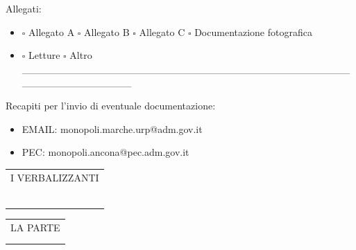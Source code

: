 \documentclass[12pt]{article}
\makeatletter
\newcommand\signature{%
  \par\vspace{8ex}\noindent
  \begin{tabular}[t]{@{}c@{}}
    I VERBALIZZANTI\\ \\
    \makebox[15em]{\dotfill}\\
    \\
    \makebox[15em]{\dotfill}\\
    \\
    \makebox[15em]{\dotfill}
  \end{tabular}
  \hfill
  \begin{tabular}[t]{@{}c@{}}
    LA PARTE\\ \\
    \makebox[15em]{\dotfill}
  \end{tabular}
}
\makeatother
\begin{document}
Allegati:
\begin{itemize}[label={}]
    \item \begin{math}\square\end{math} Allegato A \begin{math}\square\end{math} Allegato B \begin{math}\square\end{math} Allegato C \begin{math}\square\end{math} Documentazione fotografica
    \item \begin{math}\square\end{math} Letture \begin{math}\square\end{math} Altro \_\_\_\_\_\_\_\_\_\_\_\_\_\_\_\_\_\_\_\_\_\_\_\_\_\_\_\_\_\_\_\_\_\_\_\_\_\_\_\_\_\_\_\_\_\_\_\_\_\_\_\_\_\_\_\_\_\_\_\_
\end{itemize}

Recapiti per l'invio di eventuale documentazione:
\begin{itemize}[label={}]
    \item EMAIL: monopoli.marche.urp@adm.gov.it
    \item PEC: monopoli.ancona@pec.adm.gov.it
\end{itemize}

\signature
\end{document}
